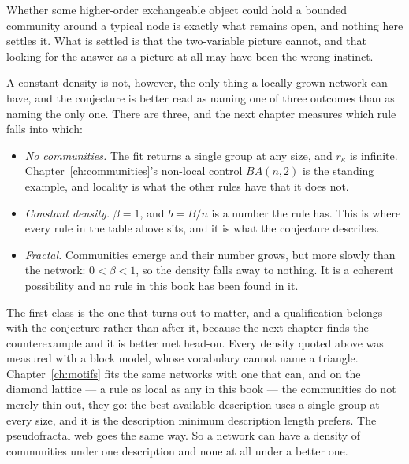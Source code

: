 Whether some higher-order exchangeable object could hold a bounded community
around a typical node is exactly what remains open, and nothing here settles it.
What is settled is that the two-variable picture cannot, and that looking for the
answer as a picture at all may have been the wrong instinct.

A constant density is not, however, the only thing a locally grown network can
have, and the conjecture is better read as naming one of three outcomes than as
naming the only one. There are three, and the next chapter measures which rule
falls into which:

\begin{itemize}
\item \emph{No communities.} The fit returns a single group at any size, and
  $r_\kappa$ is infinite. Chapter~\ref{ch:communities}'s non-local control
  $BA(n,2)$ is the standing example, and locality is what the other rules have
  that it does not.
\item \emph{Constant density.} $\beta=1$, and $b=B/n$ is a number the rule has.
  This is where every rule in the table above sits, and it is what the conjecture
  describes.
\item \emph{Fractal.} Communities emerge and their number grows, but more slowly
  than the network: $0<\beta<1$, so the density falls away to nothing. It is a
  coherent possibility and no rule in this book has been found in it.
\end{itemize}

\noindent The first class is the one that turns out to matter, and a qualification
belongs with the conjecture rather than after it, because the next chapter finds
the counterexample and it is better met head-on. Every density quoted above was
measured with a block model, whose vocabulary cannot name a triangle.
Chapter~\ref{ch:motifs} fits the same networks with one that can, and on the
diamond lattice --- a rule as local as any in this book --- the communities do not
merely thin out, they go: the best available description uses a single group at
every size, and it is the description minimum description length prefers. The
pseudofractal web goes the same way. So a network can have a density of
communities under one description and none at all under a better one.

